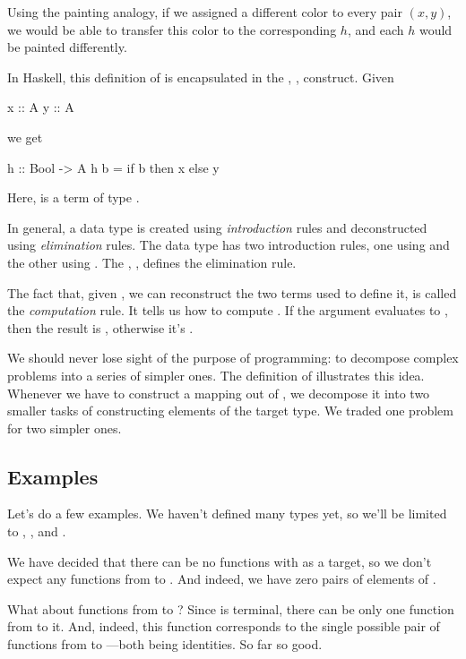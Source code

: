 \documentclass[DaoFP]{subfiles}
\begin{document}
Using the painting analogy, if we assigned a different color to every pair $(x, y)$, we would be able to transfer this color to the corresponding $h$, and each $h$ would be painted differently. 

In Haskell, this definition of  is encapsulated in the , ,  construct. Given
\begin{haskell}
x :: A
y :: A
\end{haskell}
we get
\begin{haskell}
h :: Bool -> A
h b = if b then x else y
\end{haskell}
Here,  is a term of type . 

In general, a data type is created using \emph{introduction} rules and deconstructed using \emph{elimination} rules. The  data type has two introduction rules, one using  and the other using . The , ,  defines the elimination rule. 

The fact that, given , we can reconstruct the two terms used to define it, is called the \emph{computation} rule. It tells us how to compute . If the argument evaluates to , then the result is , otherwise it's .

We should never lose sight of the purpose of programming: to decompose complex problems into a series of simpler ones. The definition of  illustrates this idea. Whenever we have to construct a mapping out of , we decompose it into two smaller tasks of constructing elements of the target type. We traded one problem for two simpler ones.

\subsection{Examples}

Let's do a few examples. We haven't defined many types yet, so we'll be limited to , \hask{()}, and . 

We have decided that there can be no functions with  as a target, so we don't expect any functions from  to . And indeed, we have zero pairs of elements of . 

What about functions from  to \hask{()}? Since \hask{()} is terminal, there can be only one function from  to it. And, indeed, this function corresponds to the single possible pair of functions from \hask{()} to \hask{()}---both being identities. So far so good.
\end{document}
